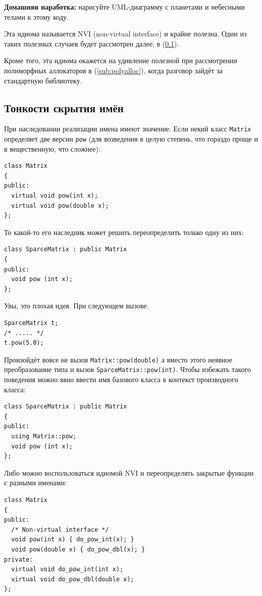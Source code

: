 \documentclass[a4paper,12pt,oneside]{book}
\begin{document}
\textbf{Домашняя наработка:} нарисуйте UML-диаграмму с планетами и небесными телами к этому коду.

Эта идиома называется NVI (non-virtual interface) и крайне полезна. Один из таких полезных случаев будет рассмотрен далее, в (\ref{NameHiding}).

Кроме того, эта идиома окажется на удивление полезной при рассмотрении полиморфных аллокаторов в (\ref{sub:polyalloc}), когда разговор зайдёт за стандартную библиотеку.

\subsection{Тонкости скрытия имён}\label{NameHiding}

При наследовании реализации имена имеют значение. Если некий класс \lstinline!Matrix! определяет две версии \lstinline!pow! (для возведения в целую степень, что гораздо проще и в вещественную, что сложнее):

\begin{lstlisting}
class Matrix
{
public:
  virtual void pow(int x);
  virtual void pow(double x);
};
\end{lstlisting}

То какой-то его наследник может решить переопределить только одну из них:

\begin{lstlisting}
class SparceMatrix : public Matrix
{
public:
  void pow (int x);
};
\end{lstlisting}

Увы, это плохая идея. При следующем вызове:

\begin{lstlisting}
SparceMatrix t;
/* ..... */
t.pow(5.0);
\end{lstlisting}

Произойдёт вовсе не вызов \lstinline!Matrix::pow(double)! а вместо этого неявное преобразование типа и вызов \lstinline!SparceMatrix::pow(int)!. Чтобы избежать такого поведения можно явно ввести имя базового класса в контекст производного класса:

\begin{lstlisting}
class SparceMatrix : public Matrix
{
public:
  using Matrix::pow;
  void pow (int x);
};
\end{lstlisting}

Либо можно воспользоваться идиомой NVI и переопределять закрытые функции с разными именами:

\begin{lstlisting}
class Matrix
{
public:
  /* Non-virtual interface */
  void pow(int x) { do_pow_int(x); }
  void pow(double x) { do_pow_dbl(x); }
private:
  virtual void do_pow_int(int x);
  virtual void do_pow_dbl(double x);
};
\end{lstlisting}
\end{document}
